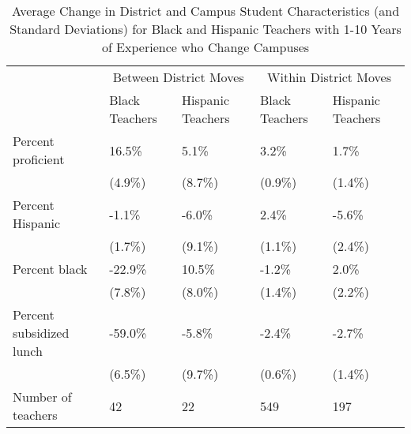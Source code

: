 \documentclass[]{article}
\begin{document}
\begin{table}[ht]
\centering
\begin{tabular}{lp{}p{}p{}p{}}
  \hline
 & \multicolumn{2}{c}{Between District Moves} & \multicolumn{2}{c}{Within District Moves}\\ \cline{2-5}
 & Black Teachers & Hispanic Teachers & Black Teachers & Hispanic Teachers \\
  \hline
Percent proficient & 16.5\% & 5.1\% & 3.2\% & 1.7\% \\ 
   & (4.9\%) & (8.7\%) & (0.9\%) & (1.4\%) \\ 
  Percent Hispanic & -1.1\% & -6.0\% & 2.4\% & -5.6\% \\ 
   & (1.7\%) & (9.1\%) & (1.1\%) & (2.4\%) \\ 
  Percent black & -22.9\% & 10.5\% & -1.2\% & 2.0\% \\ 
   & (7.8\%) & (8.0\%) & (1.4\%) & (2.2\%) \\ 
  Percent subsidized lunch & -59.0\% & -5.8\% & -2.4\% & -2.7\% \\ 
   & (6.5\%) & (9.7\%) & (0.6\%) & (1.4\%) \\ 
  Number of teachers & 42 & 22 & 549 & 197 \\ 
   \hline
\end{tabular}
\caption{Average Change in District and Campus Student Characteristics (and Standard Deviations) for Black and Hispanic Teachers with 1-10 Years of Experience who Change Campuses} 
\label{tbl:change_by_eth}
\end{table}
\end{document}
